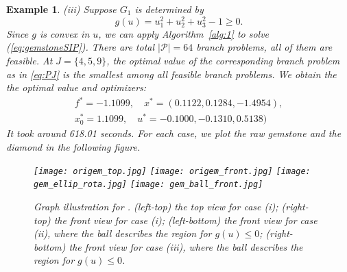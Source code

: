 \documentclass{amsart}
\newcommand{\reff}[1]{(\ref{#1})}
\theoremstyle{plain}
\newtheorem{exmp}[theorem]{Example}
\newcommand{\mc}[1]{\mathcal{#1}}
\numberwithin{equation}{section}
\begin{document}
\begin{exmp}
		(iii) Suppose $G_1$ is determined by
		\[ g(u) = u_1^2+u_2^2+u_3^2-1\ge 0. \]
		Since $g$ is convex in $u$, we can apply Algorithm~\ref{alg:1} to solve \reff{eq:gemstoneSIP}.
		There are total $|\mc{P}| = 64$ branch problems, all of them are feasible.
		At $J = \{4, 5, 9\}$, the optimal value of the corresponding branch problem as in \eqref{eq:PJ}
		is the smallest among all feasible branch problems. 
		We obtain the the optimal value and optimizers:
		\[\begin{aligned}
			f^* = -1.1099,\quad  x^* = (0.1122,0.1284,-1.4954),\\
			x_0^* = 1.1099,\quad  u^* =  -0.1000,-0.1310,0.5138)
		\end{aligned}\]
		It took around 618.01 seconds. For each case, we plot the raw gemstone and the diamond 
		in the following figure. 
		\begin{figure}[htb!]
			\centering
			\texttt{[image: origem\_top.jpg]}
			\hfill
			\texttt{[image: origem\_front.jpg]}
			\hfill
			\texttt{[image: gem\_ellip\_rota.jpg]}\hfill
			\texttt{[image: gem\_ball\_front.jpg]}
			\caption{Graph illustration for .
				(left-top) the top view for case (i); (right-top) the front view for case (i);
				(left-bottom) the front view for case (ii), where the ball describes the region for $g(u)\le 0$; 
				(right-bottom) the front view for case (iii), where the ball describes the region for $g(u)\le 0$.}
			\label{fig2:diamond}
		\end{figure}
	\end{exmp}
	
	
\end{document}
